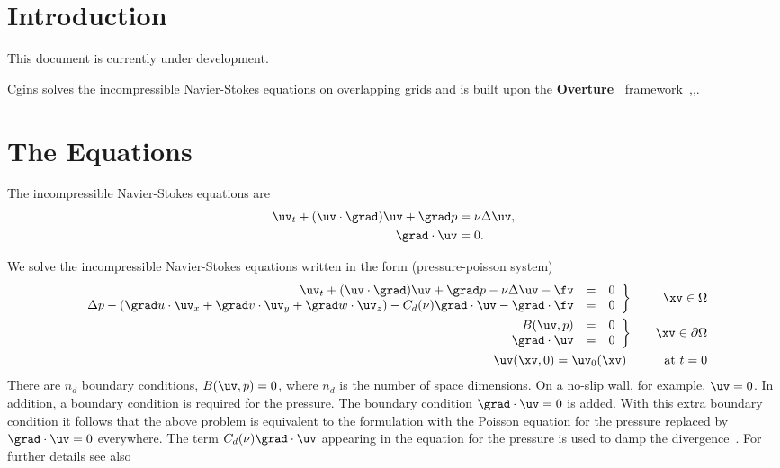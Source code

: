 \documentclass[12pt]{article}
\newcommand{\Index}[1]{#1\index{#1}}
\newcommand{\Overture}{{\bf Over\-ture\ }}
\begin{document}
\clearpage
\tableofcontents

\vfill\eject


\section{Introduction}

This document is currently under development. 


Cgins solves the incompressible Navier-Stokes equations
on overlapping grids and is built upon the \Overture 
framework~\cite{Brown97},\cite{Henshaw96a},\cite{iscope97}. 



\section{The Equations}


The incompressible Navier-Stokes equations are
\begin{align}
   \uv_t + (\uv\cdot\grad)\uv + \grad p &= \nu \Delta \uv, \\
   \grad\cdot\uv &= 0.
\end{align}

We solve the incompressible Navier-Stokes equations written in the
form (\Index{pressure-poisson system})
\begin{eqnarray}
 \left. \begin{array}{rcl}
  \uv_t + (\uv\cdot\grad)\uv + \grad p -\nu \Delta \uv -\fv &=&0
                                                \\
  \Delta p -(\grad u\cdot\uv_x + \grad v\cdot\uv_y + \grad w\cdot \uv_z)
     -C_d(\nu) \grad\cdot\uv    - \grad\cdot\fv  &=&0
        \end{array}\right\} && \xv\in\Omega       \\
 \left. \begin{array}{rcl}
        B(\uv,p) &=& 0   \\
   \grad\cdot\uv &=& 0
        \end{array}\right\} && \xv\in\partial\Omega  \nonumber \\
   \uv(\xv,0)  =  \uv_0(\xv)   ~&&~~~~\mbox{ at } t=0  \nonumber
\end{eqnarray}
There are $n_d$ boundary conditions, $B(\uv,p)=0$, where $n_d$ is
the number of space dimensions. On a no-slip wall, for example,
$\uv=0$. In addition, a boundary condition is required for the
pressure. The boundary condition $\grad\cdot\uv=0$ is added.
With this extra boundary condition it follows that the above problem
is equivalent to the formulation with the Poisson equation for
the pressure replaced by $\grad\cdot\uv=0$ everywhere. The term
$C_d(\nu) \grad\cdot\uv$ appearing in the equation for the
pressure is used to damp the divergence~\cite{INSDIV}.
For further details see also~\cite{ICNS}
\end{document}
